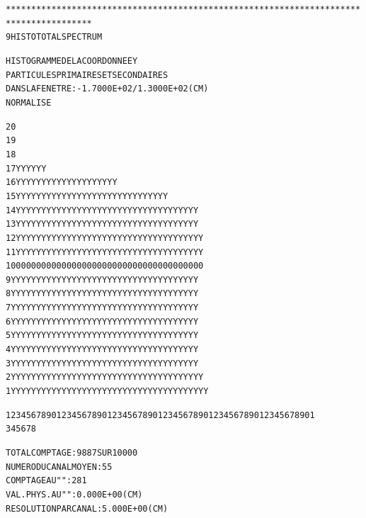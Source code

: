 \begin{alltt}
***************************************************************************************
      9  HISTO     TOTAL     SPECTRUM

                         HISTOGRAMME  DE  LA  COORDONNEE  Y    
                         PARTICULES  PRIMAIRES  ET  SECONDAIRES
                         DANS  LA  FENETRE :  -1.7000E+02 /   1.3000E+02 (CM) 
                         NORMALISE     

   20                                                                            
   19                                                                            
   18                                                                            
   17                                        Y     YY        Y  Y      Y              
   16                                      Y YYYYY YY YYY  Y YY Y Y  YYYY             
   15                                      Y YYYYY YYYYYYYYYYYYYY YYYYYYYY YY         
   14                                    YYYYYYYYY YYYYYYYYYYYYYYYYYYYYYYYYYYY        
   13                                    YYYYYYYYY YYYYYYYYYYYYYYYYYYYYYYYYYYY        
   12                                    YYYYYYYYYYYYYYYYYYYYYYYYYYYYYYYYYYYYY        
   11                                    YYYYYYYYYYYYYYYYYYYYYYYYYYYYYYYYYYYYY        
   10                                    0000000000000000000000000000000000000        
    9                                    YYYYYYYYYYYYYYYYYYYYYYYYYYYYYYYYYYYYY        
    8                                    YYYYYYYYYYYYYYYYYYYYYYYYYYYYYYYYYYYYY        
    7                                    YYYYYYYYYYYYYYYYYYYYYYYYYYYYYYYYYYYYY        
    6                                    YYYYYYYYYYYYYYYYYYYYYYYYYYYYYYYYYYYYY        
    5                                    YYYYYYYYYYYYYYYYYYYYYYYYYYYYYYYYYYYYY        
    4                                    YYYYYYYYYYYYYYYYYYYYYYYYYYYYYYYYYYYYY        
    3                                    YYYYYYYYYYYYYYYYYYYYYYYYYYYYYYYYYYYYY        
    2                                   YYYYYYYYYYYYYYYYYYYYYYYYYYYYYYYYYYYYYY        
    1                                   YYYYYYYYYYYYYYYYYYYYYYYYYYYYYYYYYYYYYYY       

                         1234567890123456789012345678901234567890123456789012345678901
                                  3         4         5         6         7         8


                TOTAL  COMPTAGE                 :    9887  SUR  10000
                NUMERO   DU  CANAL  MOYEN       :      55
                COMPTAGE  AU   "      "         :     281
                VAL. PHYS. AU  "      "         :  0.000E+00 (CM) 
                RESOLUTION  PAR  CANAL          :  5.000E+00 (CM) 


\end{alltt}
